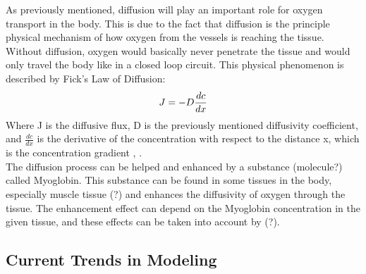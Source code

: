 As previously mentioned, diffusion will play an important role for oxygen transport in the body. This is due to the fact that diffusion is the principle physical mechanism of how oxygen from the vessels is reaching the tissue. Without diffusion, oxygen would basically never penetrate the tissue and would only travel the body like in a closed loop circuit. This physical phenomenon is described by Fick's Law of Diffusion:
\begin{equation}
\\J = - D \frac{dc}{dx}
\label{Fick}
\end{equation}
Where J is the diffusive flux, D is the previously mentioned diffusivity coefficient, and $\frac{dc}{dx}$ is the derivative of the concentration with respect to the distance x, which is the concentration gradient \cite{pittman2011regulation}, \cite{lee2017accounting}.
\\The diffusion process can be helped and enhanced by a substance (molecule?) called Myoglobin. This substance can be found in some tissues in the body, especially muscle tissue (?) and enhances the diffusivity of oxygen through the tissue. The enhancement effect can depend on the Myoglobin concentration in the given tissue, and these effects can be taken into account by (?). \cite{wittenberg1970myoglobin}


\subsection{Current Trends in Modeling}

